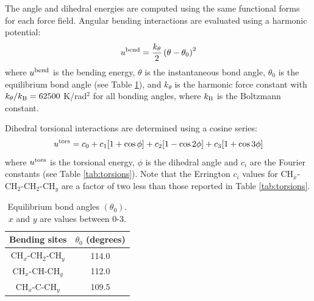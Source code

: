 \documentclass[preprint,letterpaper,floatfix,citeautoscript,aip,jcp]{revtex4-1}
\begin{document}
The angle and dihedral energies are computed using the same functional forms for each force field. Angular bending interactions are evaluated using a harmonic potential:
\begin{equation}
u^{\rm bend} = \frac{k_\theta}{2} \left(\theta-\theta_0\right)^2
\end{equation}
where $u^{\rm bend}$ is the bending energy, $\theta$ is the instantaneous bond angle, $\theta_0$ is the equilibrium bond angle (see Table \ref{tab:angles}), and $k_\theta$ is the harmonic force constant with $k_\theta/k_{\rm B} = 62500$ K/rad$^2$ for all bonding angles, where $k_{\rm B}$ is the Boltzmann constant. 

Dihedral torsional interactions are determined using a cosine series:
\begin{equation}
u^{\rm tors} = c_0 + c_1 [1+\cos{\phi}] + c_2 [1-\cos{2\phi}] + c_3 [1+\cos{3\phi}]
\end{equation}
where $u^{\rm tors}$ is the torsional energy, $\phi$ is the dihedral angle and $c_i$ are the Fourier constants (see Table \ref{tab:torsions}). Note that the Errington $c_i$ values for CH$_x$-CH$_2$-CH$_2$-CH$_y$ are a factor of two less than those reported in Table \ref{tab:torsions}. \cite{Exp6}
\begin{table}[h!]
	\caption{Equilibrium bond angles $(\theta_0)$.\cite{Martin1999} $x$ and $y$ are values between 0-3.} \label{tab:angles}
	\begin{center}%
		\begin{tabular}{|c|c|}
			\hline
			Bending sites & $\theta_0$ (degrees) \\ \hline
			CH$_x$-CH$_2$-CH$_y$ & 114.0 \\ 
			CH$_x$-CH-CH$_y$ & 112.0 \\ 
			CH$_x$-C-CH$_y$ & 109.5 \\  
			\hline
		\end{tabular}
	\end{center} 
\end{table}
\end{document}
